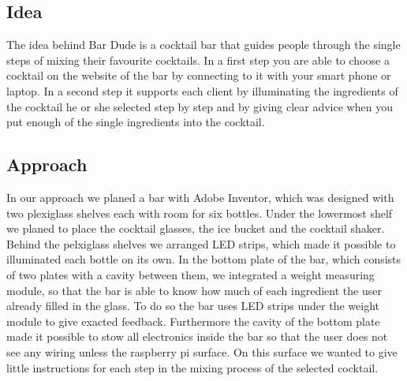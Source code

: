 \documentclass{acm_proc_article-sp}
\begin{document}
\subsection{Idea}
The idea behind Bar Dude is a cocktail bar that guides people through the single steps of mixing their favourite cocktails. In a first step you are able to choose a cocktail on the website of the bar by connecting to it with your smart phone or laptop. In a second step it supports each client by illuminating the ingredients of the cocktail he or she selected step by step and by giving clear advice when you put enough of the single ingredients into the cocktail.
\subsection{Approach}

\begin{minipage}{\linewidth}%
\label{fig:bar_inventor}%
\end{minipage}

In our approach we planed a bar with Adobe Inventor, which was designed with two plexiglass shelves each with room for six bottles. Under the lowermost shelf we planed to place the cocktail glasses, the ice bucket and the cocktail shaker. Behind the pelxiglass shelves we arranged LED strips, which made it possible to illuminated each bottle on its own.
In the bottom plate of the bar, which consists of two plates with a cavity between them, we integrated a weight measuring module, so that the bar is able to know how much of each ingredient the user already filled in the glass. To do so the bar uses LED strips under the weight module to give exacted feedback.  
Furthermore the cavity of the bottom plate made it possible to stow all electronics inside the bar so that the user does not see any wiring unless the raspberry pi surface. On this surface we wanted to give little instructions for each step in the mixing process of the selected cocktail.
\end{document}
